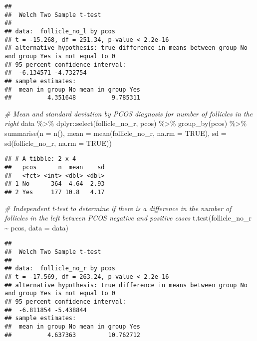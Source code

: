 \documentclass[
]{article}
\newenvironment{Shaded}{\begin{snugshade}}{\end{snugshade}}
\newcommand{\AttributeTok}[1]{\textcolor[rgb]{0.77,0.63,0.00}{#1}}
\newcommand{\CommentTok}[1]{\textcolor[rgb]{0.56,0.35,0.01}{\textit{#1}}}
\newcommand{\ConstantTok}[1]{\textcolor[rgb]{0.00,0.00,0.00}{#1}}
\newcommand{\FunctionTok}[1]{\textcolor[rgb]{0.00,0.00,0.00}{#1}}
\newcommand{\NormalTok}[1]{#1}
\newcommand{\SpecialCharTok}[1]{\textcolor[rgb]{0.00,0.00,0.00}{#1}}
\begin{document}
\begin{verbatim}
## 
##  Welch Two Sample t-test
## 
## data:  follicle_no_l by pcos
## t = -15.268, df = 251.34, p-value < 2.2e-16
## alternative hypothesis: true difference in means between group No and group Yes is not equal to 0
## 95 percent confidence interval:
##  -6.134571 -4.732754
## sample estimates:
##  mean in group No mean in group Yes 
##          4.351648          9.785311
\end{verbatim}

\begin{Shaded}
\begin{Highlighting}[]
\CommentTok{\# Mean and standard deviation by PCOS diagnosis for number of follicles in the right}
\NormalTok{data }\SpecialCharTok{\%\textgreater{}\%}\NormalTok{ dplyr}\SpecialCharTok{::}\FunctionTok{select}\NormalTok{(follicle\_no\_r, pcos) }\SpecialCharTok{\%\textgreater{}\%} \FunctionTok{group\_by}\NormalTok{(pcos) }\SpecialCharTok{\%\textgreater{}\%} 
  \FunctionTok{summarise}\NormalTok{(}\AttributeTok{n =} \FunctionTok{n}\NormalTok{(), }
            \AttributeTok{mean =} \FunctionTok{mean}\NormalTok{(follicle\_no\_r, }\AttributeTok{na.rm =} \ConstantTok{TRUE}\NormalTok{), }
            \AttributeTok{sd =} \FunctionTok{sd}\NormalTok{(follicle\_no\_r, }\AttributeTok{na.rm =} \ConstantTok{TRUE}\NormalTok{))}
\end{Highlighting}
\end{Shaded}

\begin{verbatim}
## # A tibble: 2 x 4
##   pcos      n  mean    sd
##   <fct> <int> <dbl> <dbl>
## 1 No      364  4.64  2.93
## 2 Yes     177 10.8   4.17
\end{verbatim}

\begin{Shaded}
\begin{Highlighting}[]
\CommentTok{\# Independent t{-}test to determine if there is a difference in the number of follicles in the left between PCOS negative and positive cases}
\FunctionTok{t.test}\NormalTok{(follicle\_no\_r }\SpecialCharTok{\textasciitilde{}}\NormalTok{ pcos, }\AttributeTok{data =}\NormalTok{ data)}
\end{Highlighting}
\end{Shaded}

\begin{verbatim}
## 
##  Welch Two Sample t-test
## 
## data:  follicle_no_r by pcos
## t = -17.569, df = 263.24, p-value < 2.2e-16
## alternative hypothesis: true difference in means between group No and group Yes is not equal to 0
## 95 percent confidence interval:
##  -6.811854 -5.438844
## sample estimates:
##  mean in group No mean in group Yes 
##          4.637363         10.762712
\end{verbatim}
\end{document}
